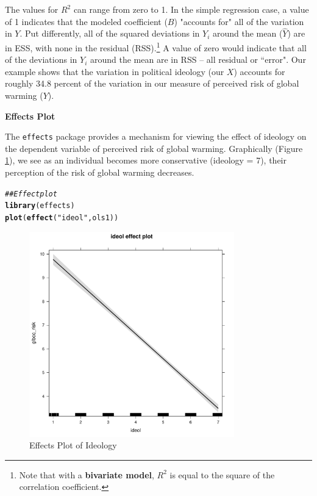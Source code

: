 \documentclass[11pt,openany]{book}\usepackage[]{graphicx}\usepackage[]{color}
\makeatletter
\newcommand{\hlstr}[1]{\textcolor[rgb]{0.192,0.494,0.8}{#1}}%
\newcommand{\hlcom}[1]{\textcolor[rgb]{0.678,0.584,0.686}{\textit{#1}}}%
\newcommand{\hlstd}[1]{\textcolor[rgb]{0.345,0.345,0.345}{#1}}%
\newcommand{\hlkwd}[1]{\textcolor[rgb]{0.737,0.353,0.396}{\textbf{#1}}}%
\newenvironment{kframe}{%
 \def\at@end@of@kframe{}%
 \ifinner\ifhmode%
  \def\at@end@of@kframe{\end{minipage}}%
  \begin{minipage}{\columnwidth}%
 \fi\fi%
 \def\FrameCommand##1{\hskip\@totalleftmargin \hskip-\fboxsep
 \colorbox{shadecolor}{##1}\hskip-\fboxsep
     \hskip-\linewidth \hskip-\@totalleftmargin \hskip\columnwidth}%
 \MakeFramed {\advance\hsize-\width
   \@totalleftmargin\z@ \linewidth\hsize
   \@setminipage}}%
 {\par\unskip\endMakeFramed%
 \at@end@of@kframe}
\newenvironment{knitrout}{}{} %
\renewenvironment{knitrout}{\begin{singlespace}}{\end{singlespace}} %
\makeatother
\begin{document}
The values for $R^{2}$ can range from zero to 1. In the simple regression case, a value of 1 indicates that the modeled coefficient ($B$) "accounts for" all of the variation in $Y$. Put differently, all of the squared deviations in $Y_{i}$ around the mean ($\hat{Y}$) are in ESS, with none in the residual (RSS).\footnote{Note that with a \textbf{bivariate model}, $R^{2}$ is equal to the square of the correlation coefficient.} A value of zero would indicate that all of the  deviations in $Y_{i}$ around the mean are in RSS -- all residual or ``error". Our example shows that the variation in political ideology (our $X$) accounts for roughly 34.8 percent of the variation in our measure of perceived risk of global warming ($Y$). 

\noindent  \textbf{Effects Plot}

The \texttt{effects} package provides a mechanism for viewing the effect of ideology on the dependent variable of perceived risk of global warming.  Graphically (Figure \ref{fig:effectsplot}), we see as an individual becomes more conservative (ideology = 7), their perception of the risk of global warming decreases.

\begin{knitrout}
\color{fgcolor}\begin{kframe}
\begin{alltt}
\hlcom{## Effect plot}
\hlkwd{library}\hlstd{(effects)}
\hlkwd{plot}\hlstd{(}\hlkwd{effect}\hlstd{(}\hlstr{"ideol"}\hlstd{, ols1))}
\end{alltt}
\end{kframe}
\end{knitrout}

\begin{figure}[!htp]
\includegraphics[width=3.5in, height=3.5in]{09_InterpretSimple/effectsplot.pdf}%
\caption{Effects Plot of Ideology \label{fig:effectsplot}}
\end{figure} 
\end{document}
